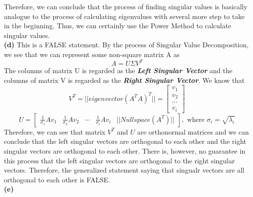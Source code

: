 \documentclass[12pt]{article}
\begin{document}
Therefore, we can conclude that the process of finding singular values is basically analogue to the process of calculating eigenvalues with several more step to take in the beginning. Thus, we can certainly use the Power Method to calculate singular values. \\
\textbf{(d)}
This is a FALSE statement. By the process of Singular Value Decomposition, we see that we can represent some non-square matrix A as 
$$A = U\Sigma V^{T}$$
The columns of matrix U is regarded as the \textbf{\textit{Left Singular Vector}} and the columns of matrix V is regarded as the \textbf{\textit{Right Singular Vector}}. We know that
$$V^{T} = ||eigenvector(A^{T}A)^{T}|| = \begin{bmatrix}
v_{1} \\ v_{2} \\ \cdots \\ v_{i}
\end{bmatrix}$$
$$ U = \begin{bmatrix}
\frac{1}{\sigma_{1}}Av_{1} & \frac{1}{\sigma_{2}}Av_{2} & \cdots &  \frac{1}{\sigma_{i}}Av_{i}&  ||Nullspace(A^{T})||
\end{bmatrix},
\text{ where } \sigma_{i} = \sqrt{\lambda_{i}}$$
Therefore, we can see that matrix $V^{T}$ and $U$ are orthonormal matrices and we can conclude that the left singular vectors are orthogonal to each other and the right singular vectors are orthogonal to each other. There is, however, no guarantee in this process that the left singular vectors are orthogonal to the right singular vectors. Therefore, the generalized statement saying that singualr vectors are all orthogonal to each other is FALSE. \\
\textbf{(e)}
\end{document}
